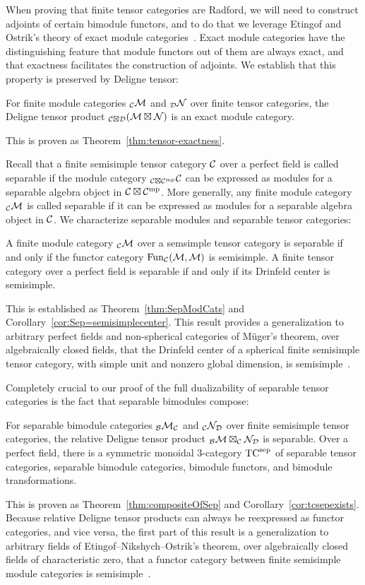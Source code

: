 \documentclass{amsart}
\begin{document}
When proving that finite tensor categories are Radford, we will need to construct adjoints of certain bimodule functors, and to do that we leverage Etingof and Ostrik's theory of exact module categories~\cite{EO-ftc}.  Exact module categories have the distinguishing feature that module functors out of them are always exact, and that exactness facilitates the construction of adjoints.  We establish that this property is preserved by Deligne tensor:
\begin{maintheorem} \label{thm10}
For finite module categories ${}_\mathcal C \mathcal M$ and ${}_\mathcal D \mathcal N$ over finite tensor categories, the Deligne tensor product ${}_{\mathcal C \boxtimes \mathcal D} (\mathcal M \boxtimes \mathcal N)$ is an exact module category.
\end{maintheorem}
\nid This is proven as Theorem~\ref{thm:tensor-exactness}.

Recall that a finite semisimple tensor category $\mathcal C$ over a perfect field is called separable if the module category ${}_{\mathcal C \boxtimes \mathcal C^{\mathrm{mp}}} \mathcal C$ can be expressed as modules for a separable algebra object in $\mathcal C \boxtimes \mathcal C^{\mathrm{mp}}$.  More generally, any finite module category ${}_\mathcal C \mathcal M$ is called separable if it can be expressed as modules for a separable algebra object in $\mathcal C$.  We characterize separable modules and separable tensor categories:
\begin{maintheorem} \label{thm11}
A finite module category ${}_\mathcal C \mathcal M$ over a semsimple tensor category is separable if and only if the functor category $\operatorname{Fun}_\mathcal C(\mathcal M,\mathcal M)$ is semisimple.  A finite tensor category over a perfect field is separable if and only if its Drinfeld center is semisimple.
\end{maintheorem}
\nid This is established as Theorem~\ref{thm:SepModCats} and Corollary~\ref{cor:Sep=semisimplecenter}.  This result provides a generalization to arbitrary perfect fields and non-spherical categories of M\"uger's theorem, over algebraically closed fields, that the Drinfeld center of a spherical finite semisimple tensor category, with simple unit and nonzero global dimension, is semisimple~\cite{MR1966525}.

Completely crucial to our proof of the full dualizability of separable tensor categories is the fact that separable bimodules compose:
\begin{maintheorem} \label{thm12}
For separable bimodule categories ${}_\mathcal B \mathcal M_\mathcal C$ and ${}_\mathcal C \mathcal N_\mathcal D$ over finite semisimple tensor categories, the relative Deligne tensor product ${}_\mathcal B \mathcal M \boxtimes_\mathcal C \mathcal N_\mathcal D$ is separable.  Over a perfect field, there is a symmetric monoidal 3-category ${\mathrm{TC}^{\mathrm{sep}}}$ of separable tensor categories, separable bimodule categories, bimodule functors, and bimodule transformations.
\end{maintheorem}
\nid This is proven as Theorem~\ref{thm:compositeOfSep} and Corollary~\ref{cor:tcsepexists}.  Because relative Deligne tensor products can always be reexpressed as functor categories, and vice versa, the first part of this result is a generalization to arbitrary fields of Etingof--Nikshych--Ostrik's theorem, over algebraically closed fields of characteristic zero, that a functor category between finite semisimple module categories is semisimple~\cite{MR2183279}.
\end{document}
